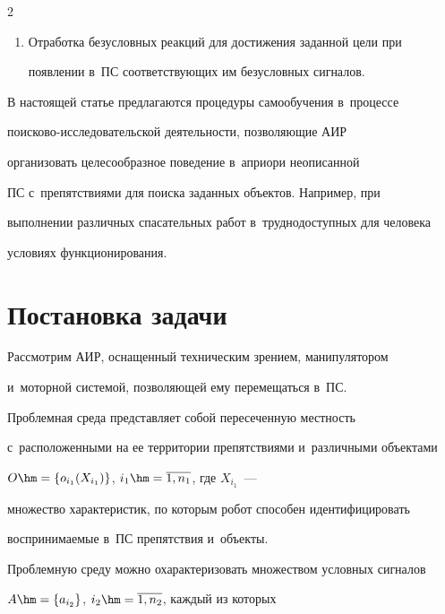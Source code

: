 \begin{multicols}{2}
\begin{enumerate}[1.]
в~ПС закрепленных в~этих программах услов\-ных сигналов. 


  \item Отработка безусловных реакций для достижения заданной цели при 


появлении в~ПС со\-от\-вет\-ст\-ву\-ющих им без\-услов\-ных сигналов.


  \end{enumerate}


  


  В настоящей статье предлагаются процедуры са\-мо\-обуче\-ния в~процессе  


по\-иско\-во-ис\-сле\-до\-ва\-тель\-ской деятельности, поз\-во\-ля\-ющие АИР 


организовать целесообразное поведение в~априори \mbox{неописанной} 


ПС с~препятствиями для поиска заданных объектов. Например, при 


выполнении различных спасательных работ в~труднодоступных для человека 


условиях функционирования.


  


\section{Постановка задачи}





  Рассмотрим АИР, оснащенный техническим зрением, манипулятором 


и~моторной сис\-те\-мой, поз\-во\-ля\-ющей ему перемещаться в~ПС. 


Проблемная среда пред\-став\-ля\-ет собой пересеченную мест\-ность 


с~расположенными на ее территории препятствиями и~различными объектами 


$O\hm= \{ o_{i_1}(X_{i_1})\}$, $i_1\hm= \overline{1,n_1}$, где $X_{i_1}$~--- 


множество характеристик, по которым робот способен идентифицировать 


воспринимаемые в~ПС препятствия и~объекты. 


  


  Проблемную среду можно охарактеризовать множеством условных сигналов 


  $A\hm= \{a_{i_2}\}$, $i_2\hm=\overline{1,n_2}$, каждый из которых 



\end{multicols}
